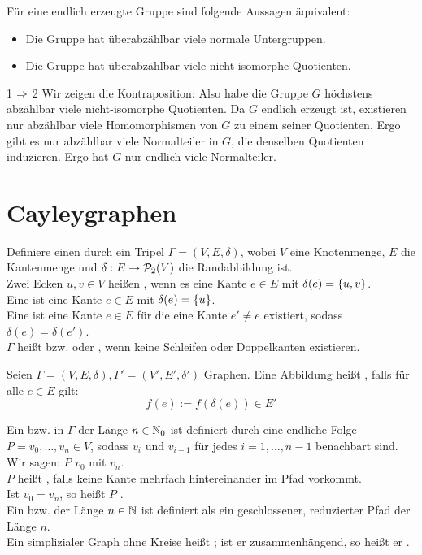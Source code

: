 \documentclass{article}
\begin{document}
\Prop{}
Für eine endlich erzeugte Gruppe sind folgende Aussagen äquivalent:
\begin{itemize}
\item Die Gruppe hat überabzählbar viele normale Untergruppen.
\item Die Gruppe hat überabzählbar viele nicht-isomorphe Quotienten.
\end{itemize}
\begin{Beweis}{1 $\impl{}$ 2}
Wir zeigen die Kontraposition: Also habe die Gruppe $G$ höchstens abzählbar viele nicht-isomorphe Quotienten. Da $G$ endlich erzeugt ist, existieren nur abzählbar viele Homomorphismen von $G$ zu einem seiner Quotienten. Ergo gibt es nur abzählbar viele Normalteiler in $G$, die denselben Quotienten induzieren. Ergo hat $G$ nur endlich viele Normalteiler.
\end{Beweis}


\newpage
\section{Cayleygraphen}
Definiere einen  durch ein Tripel $\Gamma = (V,E,\delta)$, wobei $V$ eine Knotenmenge, $E$ die Kantenmenge und $\delta : E \rightarrow \P_2(V)$ die Randabbildung ist.\\
Zwei Ecken $u,v \in V$ heißen , wenn es eine Kante $e \in E$ mit $\delta(e) = \set{u,v}{}$.\\
Eine  ist eine Kante $e \in E$ mit $\delta(e) = \set{u}{}$.\\
Eine ist eine Kante $e \in E$ für die eine Kante $e' \neq e$ existiert, sodass $\delta(e) = \delta(e')$.\\
$\Gamma$ heißt  bzw.  oder , wenn keine Schleifen oder Doppelkanten existieren.


Seien $\Gamma = (V,E, \delta), \Gamma' = (V', E', \delta')$ Graphen. Eine Abbildung
heißt , falls für alle $e \in E$ gilt:
\[ f(e) := f(\delta(e)) \in E' \]

Ein  bzw.  in $\Gamma$ der Länge $n \in \N_0$ ist definiert durch eine endliche Folge $P = v_0,\ldots, v_n \in V$, sodass $v_i$ und $v_{i+1}$ für jedes $i = 1,\ldots, n-1$ benachbart sind.\\
Wir sagen: $P$  $v_0$ mit $v_n$.\\
$P$ heißt , falls keine Kante mehrfach hintereinander im Pfad vorkommt.\\
Ist $v_0 = v_n$, so heißt $P$ .\\
Ein  bzw.  der Länge $n \in \N$ ist definiert als ein geschlossener, reduzierter Pfad der Länge $n$.\\
Ein simplizialer Graph ohne Kreise heißt ; ist er zusammenhängend, so heißt er .
\end{document}
